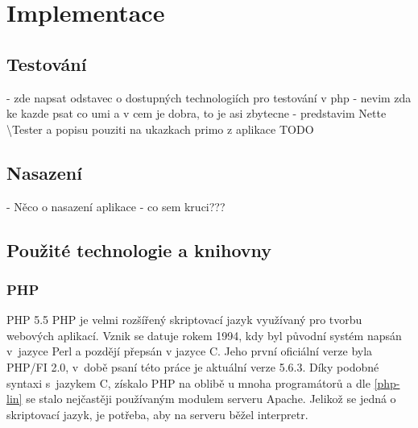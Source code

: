 \documentclass[11pt,oneside]{fithesis}
\begin{document}
\chapter{Implementace}

        \section{Testování}
        - zde napsat odstavec o dostupných technologiích pro testování v php
        - nevim zda ke kazde psat co umi a v cem je dobra, to je asi zbytecne
        - predstavim Nette \textbackslash Tester a popisu pouziti na ukazkach primo z aplikace
        TODO

        \section{Nasazení}
        - Něco o nasazení aplikace
        - co sem kruci???

        \section{Použité technologie a knihovny}

        \subsection{PHP}
        PHP 5.5 
        PHP je velmi rozšířený skriptovací jazyk využívaný pro tvorbu webových aplikací. Vznik se datuje rokem 1994, kdy byl původní systém napsán v jazyce Perl a pozdějí přepsán v jazyce C. Jeho první oficiální verze byla PHP/FI 2.0, v době psaní této práce je aktuální verze 5.6.3. Díky podobné syntaxi s jazykem C, získalo PHP na oblibě u mnoha programátorů a dle \ref{php-lin} se stalo nejčastěji používaným modulem serveru Apache. Jelikož se jedná o skriptovací jazyk, je potřeba, aby na serveru běžel interpretr.
\end{document}
